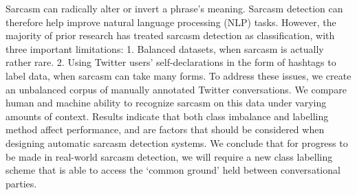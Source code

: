Sarcasm can radically alter or invert a phrase's meaning. Sarcasm detection can therefore help improve natural language processing (NLP) tasks. However, the majority of prior research has treated sarcasm detection as classification, with three important limitations: 1. Balanced datasets, when sarcasm is actually rather rare. 2. Using Twitter users' self-declarations in the form of hashtags to label data, when sarcasm can take many forms. To address these issues, we create an unbalanced corpus of manually annotated Twitter conversations. We compare human and machine ability to recognize sarcasm on this data under varying amounts of context. Results indicate that both class imbalance and labelling method affect performance, and are factors that should be considered when designing automatic sarcasm detection systems. We conclude that for progress to be made in real-world sarcasm detection, we will require a new class labelling scheme that is able to access the `common ground' held between conversational parties.
